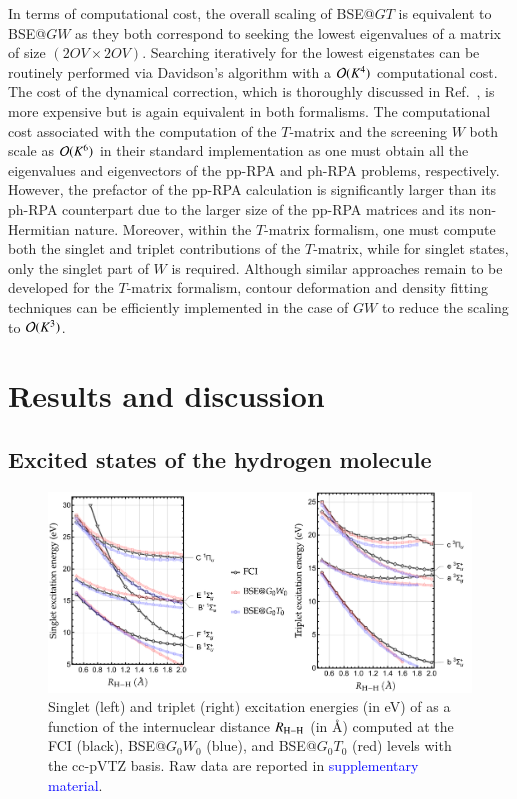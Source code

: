 \documentclass[aip,jcp,reprint,noshowkeys,superscriptaddress]{revtex4-1}
\newcommand{\SupMat}{\textcolor{blue}{supplementary material}}
\newcommand{\Norb}{K}
\newcommand{\Nocc}{O}
\newcommand{\Nvir}{V}
\begin{document}
In terms of computational cost, the overall scaling of BSE@$GT$ is equivalent to BSE@$GW$ as they both correspond to seeking the lowest eigenvalues of a matrix of size $(2\Nocc\Nvir \times 2\Nocc\Nvir)$. 
Searching iteratively for the lowest eigenstates can be routinely performed via Davidson's algorithm with a $\order*{\Norb^4}$ computational cost. \cite{Davidson_1975}
The cost of the dynamical correction, which is thoroughly discussed in Ref.~, is more expensive but is again equivalent in both formalisms.
The computational cost associated with the computation of the $T$-matrix and the screening $W$ both scale as $\order*{\Norb^6}$ in their standard implementation as one must obtain all the eigenvalues and eigenvectors of the pp-RPA and ph-RPA problems, respectively. \cite{Shenvi_2014} 
However, the prefactor of the pp-RPA calculation is significantly larger than its ph-RPA counterpart due to the larger size of the pp-RPA matrices and its non-Hermitian nature. \cite{Peng_2013,Scuseria_2013,Yang_2013,Yang_2013b,Yang_2014a,Zhang_2015,Zhang_2016}
Moreover, within the $T$-matrix formalism, one must compute both the singlet and triplet contributions of the $T$-matrix, while for singlet states, only the singlet part of $W$ is required.
Although similar approaches remain to be developed for the $T$-matrix formalism, contour deformation and density fitting techniques can be efficiently implemented in the case of $GW$ to reduce the scaling to $\order*{\Norb^3}$. \cite{Duchemin_2019,Duchemin_2020,Duchemin_2021}

\section{Results and discussion}
\label{sec:res}

\subsection{Excited states of the hydrogen molecule}
\label{sec:h2}

\begin{figure}[t]
	\includegraphics[width=\textwidth]{fig1}
	\caption{Singlet (left) and triplet (right) excitation energies (in \si{\eV}) of  as a function of the internuclear distance $R_{\ce{H-H}}$ (in \si{\angstrom}) computed at the FCI (black), BSE@$G_0W_0$ (blue), and BSE@$G_0T_0$ (red) levels with the cc-pVTZ basis.
	Raw data are reported in {\SupMat}.}
	\label{fig:H2}
\end{figure}
\end{document}
